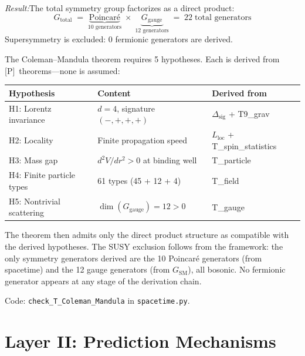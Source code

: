 \documentclass[11pt]{article}
\newcommand{\Lloc}{L_{\mathrm{loc}}}
\begin{document}
\begin{tcolorbox}[apfbox, title={T\_Coleman\_Mandula: Spacetime--Internal Factorization}]
\textit{Result:}\quad The total symmetry group factorizes as a direct product:
\begin{equation}
G_{\mathrm{total}} \;=\; \underbrace{\text{Poincar\'e}}_{\text{10 generators}} \;\times\; \underbrace{G_{\mathrm{gauge}}}_{\text{12 generators}} \;=\; 22 \;\text{total generators}
\end{equation}
Supersymmetry is excluded: 0 fermionic generators are derived.
\end{tcolorbox}

The Coleman--Mandula theorem requires 5 hypotheses.  Each is derived from [P]~theorems---none is assumed:

\smallskip
\begin{center}
\small
\begin{tabular}{lll}
\toprule
\textbf{Hypothesis} & \textbf{Content} & \textbf{Derived from} \\
\midrule
H1: Lorentz invariance & $d = 4$, signature $(-,+,+,+)$ & $\Delta_{\mathrm{sig}}$ + T9\_grav \\
H2: Locality & Finite propagation speed & $\Lloc$ + T\_spin\_statistics \\
H3: Mass gap & $d^2V/dr^2 > 0$ at binding well & T\_particle \\
H4: Finite particle types & 61 types (45 + 12 + 4) & T\_field \\
H5: Nontrivial scattering & $\dim(G_{\mathrm{gauge}}) = 12 > 0$ & T\_gauge \\
\bottomrule
\end{tabular}
\end{center}
\smallskip

The theorem then admits only the direct product structure as compatible with the derived hypotheses.  The SUSY exclusion follows from the framework: the only symmetry generators derived are the 10 Poincar\'e generators (from spacetime) and the 12 gauge generators (from $G_{\mathrm{SM}}$), all bosonic.  No fermionic generator appears at any stage of the derivation chain.

Code: \texttt{check\_T\_Coleman\_Mandula} in \texttt{spacetime.py}.


\section{Layer II: Prediction Mechanisms}
\end{document}
